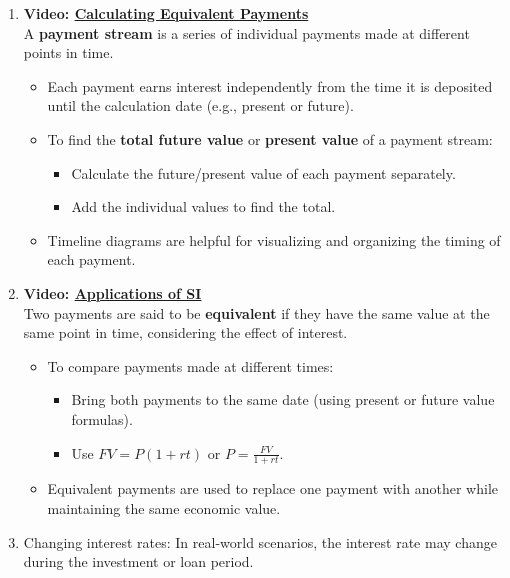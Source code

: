 \documentclass[
]{book}
\providecommand{\tightlist}{%
  \setlength{\itemsep}{0pt}\setlength{\parskip}{0pt}}
\begin{document}
\begin{enumerate}
\def\labelenumi{\arabic{enumi}.}
\tightlist
\item
  \textbf{Video: \href{https://youtu.be/eCy0_cPgobc}{Calculating Equivalent Payments}}\\
  A \textbf{payment stream} is a series of individual payments made at different points in time.

  \begin{itemize}
  \tightlist
  \item
    Each payment earns interest independently from the time it is deposited until the calculation date (e.g., present or future).
  \item
    To find the \textbf{total future value} or \textbf{present value} of a payment stream:

    \begin{itemize}
    \tightlist
    \item
      Calculate the future/present value of each payment separately.
    \item
      Add the individual values to find the total.
    \end{itemize}
  \item
    Timeline diagrams are helpful for visualizing and organizing the timing of each payment.
  \end{itemize}
\item
  \textbf{Video: \href{https://youtu.be/0v4t_Xp7tGo}{Applications of SI}}\\
  Two payments are said to be \textbf{equivalent} if they have the same value at the same point in time, considering the effect of interest.

  \begin{itemize}
  \tightlist
  \item
    To compare payments made at different times:

    \begin{itemize}
    \tightlist
    \item
      Bring both payments to the same date (using present or future value formulas).
    \item
      Use \(FV = P(1 + rt)\) or \(P = \frac{FV}{1 + rt}\).
    \end{itemize}
  \item
    Equivalent payments are used to replace one payment with another while maintaining the same economic value.
  \end{itemize}
\item
  Changing interest rates: In real-world scenarios, the interest rate may change during the investment or loan period.


\end{enumerate}
\end{document}
